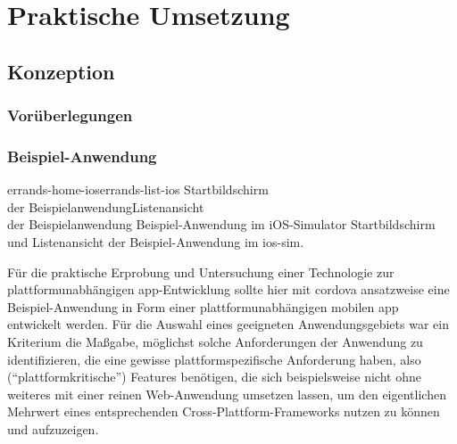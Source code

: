 \part{Praktische Umsetzung} \label{sec:praxis} 

\chapter{Konzeption}	

\section{Vorüberlegungen}	\label{sec:kriterien}
	
	
	
	

\section{Beispiel-Anwendung}	\label{sec:bsp-app} 




	{errands-home-ios}{errands-list-ios}
	{Startbildschirm \\ der Beispielanwendung}{Listenansicht \\der Beispielanwendung}
	{Beispiel-Anwendung im iOS-Simulator}
	{Startbildschirm und Listenansicht der Beispiel-Anwendung im \gls{ios-sim}.}
	{\ownScreenshot}

Für die praktische Erprobung und Untersuchung einer Technologie zur plattformunabhängigen \gls{app}-Entwicklung sollte hier mit \gls{cordova} ansatzweise eine Beispiel-Anwendung in Form einer plattformunabhängigen mobilen \gls{app} entwickelt werden.
Für die Auswahl eines geeigneten Anwendungsgebiets war ein Kriterium die Maßgabe, möglichst solche Anforderungen der Anwendung zu identifizieren, die eine gewisse plattformspezifische Anforderung haben, also (\enquote{plattformkritische}) Features benötigen, die sich beispielsweise nicht ohne weiteres mit einer reinen Web-Anwendung umsetzen lassen, um den eigentlichen Mehrwert eines entsprechenden Cross-Plattform-Frameworks nutzen zu können und aufzuzeigen.

